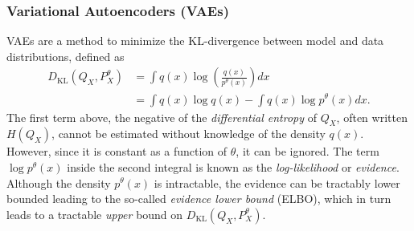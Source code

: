 \subsubsection{Variational Autoencoders (VAEs)}

VAEs \citep{kingma2013auto, rezende2014stochastic} are a method to minimize the KL-divergence between model and data distributions, defined as
%
\begin{align*}
D_{\text{KL}}(Q_X, P^\theta_X) &= \int q(x) \log \left( \frac{q(x)}{p^\theta(x)} \right) dx \\
&= \int q(x) \log q(x) - \int q(x) \log p^\theta(x) dx.
\end{align*}
%
The first term above, the negative of the \emph{differential entropy} of $Q_X$, often written $H(Q_X)$, cannot be estimated without knowledge of the density $q(x)$.
However, since it is constant as a function of $\theta$, it can be ignored.
The term $\log p^\theta(x)$ inside the second integral is known as the \emph{log-likelihood} or \emph{evidence}. 
Although the density $p^\theta(x)$ is intractable, the evidence can be tractably lower bounded leading to the so-called \emph{evidence lower bound} (ELBO), which in turn leads to a tractable \emph{upper} bound on $D_{\text{KL}}(Q_X, P^\theta_X)$. 

